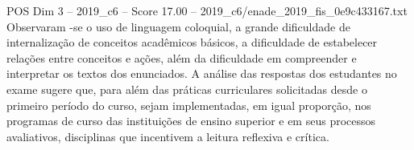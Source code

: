 \begin{textsample}{POS Dim 3 – 2019\_c6 – Score 17.00 – 2019\_c6/enade\_2019\_fis\_0e9c433167.txt}
Observaram -se o uso de linguagem coloquial, a grande dificuldade de internalização de conceitos acadêmicos básicos, a dificuldade de estabelecer relações entre conceitos e ações, além da dificuldade em compreender e interpretar os textos dos enunciados.
A análise das respostas dos estudantes no exame sugere que, para além das práticas curriculares solicitadas desde o primeiro período do curso, sejam implementadas, em igual proporção, nos programas de curso das instituições de ensino superior e em seus processos avaliativos, disciplinas que incentivem a leitura reflexiva e crítica.

\end{textsample}
